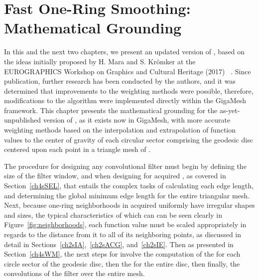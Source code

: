 \chapter{Fast One-Ring Smoothing: Mathematical Grounding}
\label{ch4}
In this and the next two chapters, we present an updated version of , based on the ideas initially proposed by H. Mara and S. Krömker at the EUROGRAPHICS Workshop on Graphics and Cultural Heritage (2017) ~\cite[s.~3.2]{Mara17}. Since publication, further research has been conducted by the authors, and it was determined that improvements to the weighting methods were possible, therefore, modifications to the algorithm were implemented directly within the GigaMesh  framework. This chapter presents the mathematical grounding for the as-yet-unpublished version of , as it exists now in GigaMesh, with more accurate weighting methods based on the interpolation and extrapolation of function values to the center of gravity of each circular sector comprising the geodesic disc centered upon each point in a triangle mesh of \tdd{}.

The procedure for designing any convolutional filter must begin by defining the size of the filter window, and when designing for acquired \tdd{}, as covered in Section~\ref{ch4sSEL}, that entails the complex tasks of calculating each edge length, and determining the global minimum edge length for the entire triangular mesh. Next, because one-ring neighborhoods in acquired \tdd{} uniformly have irregular shapes and sizes, the typical characteristics of which can can be seen clearly in Figure~\ref{fig:neighborhoods}, each function value must be scaled appropriately in regards to the distance from it to all of its neighboring points, as discussed in detail in Sections~\ref{ch2sIA},~\ref{ch2sACG}, and~\ref{ch2sIE}. Then as presented in Section~\ref{ch4sWM}, the next steps for  involve the computation of the  for each circle sector of the geodesic disc, then the \wmfv{} for the entire disc, then finally, the convolutions of the filter over the entire mesh.

%
%
%
%

